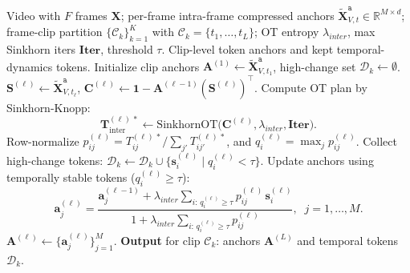 \renewcommand{\algorithmicrequire}{\textbf{Input:}}
\renewcommand{\algorithmicensure}{\textbf{Output:}}
\begin{algorithm}[tb]
\caption{\!\!\! \textbf{:} Inter-Frame Inference of AOT with OT}
\label{Algorithm:inter}
\begin{algorithmic}[1]
    \Require Video with $F$ frames $\bm{X}$; 
    per-frame intra-frame compressed anchors 
    $\tilde{\bm{X}}^{\texttt{a}}_{V,t} \in \mathbb{R}^{M \times d}$;
    frame-clip partition $\{\mathcal{C}_k\}_{k=1}^{K}$ with 
    $\mathcal{C}_k=\{t_1,\dots,t_L\}$;
    OT entropy $\lambda_{inter}$, max Sinkhorn iters $\mathbf{Iter}$, threshold $\tau$.
    \Ensure  Clip-level token anchors and kept temporal-dynamics tokens.
     
        \State Initialize clip anchors 
        $\bm{A}^{(1)} \gets \tilde{\bm{X}}^{\texttt{a}}_{V,t_1}$,
        high-change set $\mathcal{D}_k \gets \emptyset$.
         
            \State $\bm{S}^{(\ell)} \gets \tilde{\bm{X}}^{\texttt{a}}_{V,t_\ell}$,
            $\bm{C}^{(\ell)} \gets \bm{1} - \bm{A}^{(\ell-1)} (\bm{S}^{(\ell)})^\top$.
            \State Compute OT plan by Sinkhorn-Knopp:
            \[
                \bm{T}^{(\ell)\,*}_{\text{inter}}
                \gets \mathrm{SinkhornOT}
                \big(\bm{C}^{(\ell)}, \lambda_{inter}, \mathbf{Iter}\big).
            \]
            \State Row-normalize 
            $p^{(\ell)}_{ij} =
            T^{(\ell)\,*}_{ij} /
            \sum_{j'} T^{(\ell)\,*}_{ij'}$, 
            and $q^{(\ell)}_i = \max_j p^{(\ell)}_{ij}$.
            \State Collect high-change tokens:
            $\mathcal{D}_k \gets \mathcal{D}_k 
                \cup \{\bm{s}^{(\ell)}_i \mid q^{(\ell)}_i < \tau\}$.
            \State Update anchors using temporally stable tokens
            ($q^{(\ell)}_i \ge \tau$):
            \[
                \bm{a}^{(\ell)}_j
                =
                \frac{
                    \bm{a}^{(\ell-1)}_j
                    +
                    \lambda_{inter}
                    \sum_{i:\,q^{(\ell)}_i \ge \tau}
                    p^{(\ell)}_{ij}\,\bm{s}^{(\ell)}_i
                }{
                    1
                    +
                    \lambda_{inter}
                    \sum_{i:\,q^{(\ell)}_i \ge \tau}
                    p^{(\ell)}_{ij}
                },\;\; j=1,\dots,M.
            \]
            \State $\bm{A}^{(\ell)} \gets \{\bm{a}^{(\ell)}_j\}_{j=1}^{M}$.
        \EndFor
        \State \textbf{Output} for clip $\mathcal{C}_k$:
        anchors $\bm{A}^{(L)}$ and temporal tokens $\mathcal{D}_k$.
    \EndFor
\end{algorithmic}
\end{algorithm}




